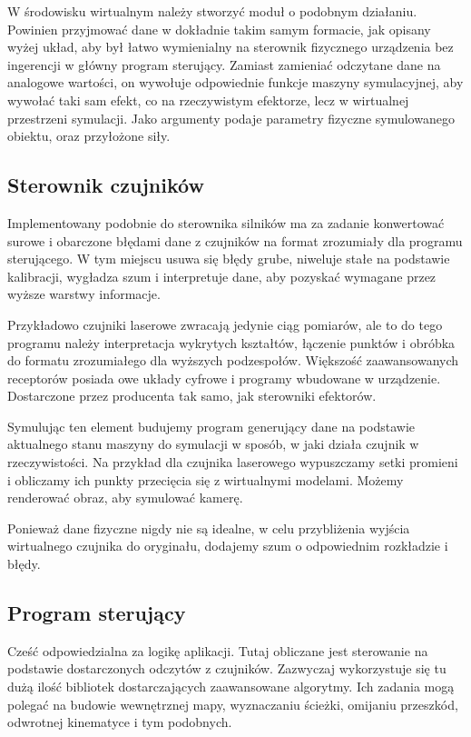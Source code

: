 	W środowisku wirtualnym należy stworzyć moduł o podobnym działaniu.
	Powinien przyjmować dane w dokładnie takim samym formacie, jak opisany wyżej układ, aby był łatwo wymienialny na sterownik fizycznego urządzenia bez ingerencji w główny program sterujący.
	Zamiast zamieniać odczytane dane na analogowe wartości, on wywołuje odpowiednie funkcje maszyny symulacyjnej, aby wywołać taki sam efekt, co na rzeczywistym efektorze, lecz w wirtualnej przestrzeni symulacji.
	Jako argumenty podaje parametry fizyczne symulowanego obiektu, oraz przyłożone siły.
	

	\subsection{Sterownik czujników}
	Implementowany podobnie do sterownika silników ma za zadanie konwertować surowe i obarczone błędami dane z czujników na format zrozumiały dla programu sterującego.
	W tym miejscu usuwa się błędy grube, niweluje stałe na podstawie kalibracji, wygładza szum i interpretuje dane, aby pozyskać wymagane przez wyższe warstwy informacje.

	Przykładowo czujniki laserowe zwracają jedynie ciąg pomiarów, ale to do tego programu należy interpretacja wykrytych kształtów, łączenie punktów i obróbka do formatu zrozumiałego dla wyższych podzespołów.
	Większość zaawansowanych receptorów posiada owe układy cyfrowe i programy wbudowane w urządzenie.
	Dostarczone przez producenta tak samo, jak sterowniki efektorów.
	
	Symulując ten element budujemy program generujący dane na podstawie aktualnego stanu maszyny do symulacji w sposób, w jaki działa czujnik w rzeczywistości.
	Na przykład dla czujnika laserowego wypuszczamy setki promieni i obliczamy ich punkty przecięcia się z wirtualnymi modelami.
	Możemy renderować obraz, aby symulować kamerę.

	Ponieważ dane fizyczne nigdy nie są idealne, w celu przybliżenia wyjścia wirtualnego czujnika do oryginału, dodajemy szum o odpowiednim rozkładzie i błędy.

	\subsection{Program sterujący}
	Cześć odpowiedzialna za logikę aplikacji. Tutaj obliczane jest sterowanie na podstawie dostarczonych odczytów z czujników.
	Zazwyczaj wykorzystuje się tu dużą ilość bibliotek dostarczających zaawansowane algorytmy.
	Ich zadania mogą polegać na budowie wewnętrznej mapy, wyznaczaniu ścieżki, omijaniu przeszkód, odwrotnej kinematyce i tym podobnych.

